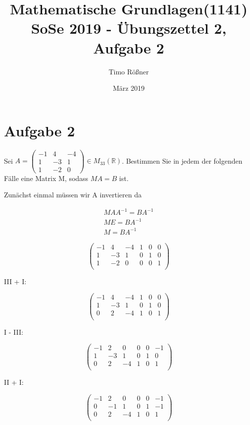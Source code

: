 \documentclass{article}
\title{Mathematische Grundlagen(1141) SoSe 2019 - Übungszettel 2, Aufgabe 2}
\author{Timo Rößner }
\date{März 2019}
\begin{document}
\maketitle

\section*{Aufgabe 2}

Sei
\(
A=
  \begin{pmatrix}
    -1 & 4 & -4 \\
    1 & -3 & 1 \\
    1 & -2 & 0
  \end{pmatrix}
\in M_{33}(\mathbb{R})
\).
Bestimmen Sie in jedem der folgenden Fälle eine Matrix M, sodass \(MA = B\) ist.

Zunächst einmal müssen wir A invertieren da

\[
\begin{split}
MAA^{-1} = BA^{-1} \\
ME = BA^{-1} \\
M = BA^{-1}
\end{split}
\]

\[
\left (
\begin{array}{ccc|ccc}
  -1 & 4 & -4 & 1 & 0 & 0 \\
  1 & -3 & 1 & 0 & 1 & 0 \\
  1 & -2 & 0 & 0 & 0 & 1 \\
\end{array}
\right )
\]

III + I:

\[
\left (
\begin{array}{ccc|ccc}
  -1 & 4 & -4 & 1 & 0 & 0 \\
  1 & -3 & 1 & 0 & 1 & 0 \\
  0 & 2 & -4 & 1 & 0 & 1 \\
\end{array}
\right )
\]

I - III:

\[
\left (
\begin{array}{ccc|ccc}
  -1 & 2 & 0 & 0 & 0 & -1 \\
  1 & -3 & 1 & 0 & 1 & 0 \\
  0 & 2 & -4 & 1 & 0 & 1 \\
\end{array}
\right )
\]

II + I:

\[
\left (
\begin{array}{ccc|ccc}
  -1 & 2 & 0 & 0 & 0 & -1 \\
  0 & -1 & 1 & 0 & 1 & -1 \\
  0 & 2 & -4 & 1 & 0 & 1 \\
\end{array}
\right )
\]
\end{document}

